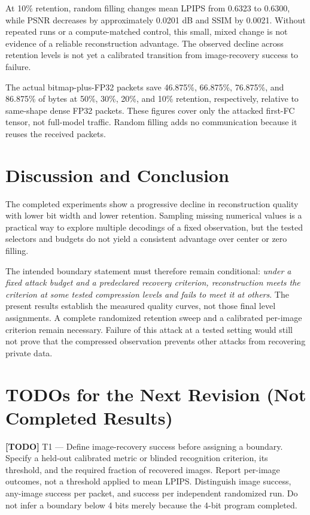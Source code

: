 \documentclass{article}
\newcommand{\todo}[1]{\par\noindent\textbf{[TODO]} #1\par}
\newif\ifshowtodos
\begin{document}
At 10\% retention, random filling changes mean LPIPS from 0.6323 to
0.6300, while PSNR decreases by approximately 0.0201 dB and SSIM by
0.0021. Without repeated runs or a compute-matched control, this small,
mixed change is not evidence of a reliable reconstruction advantage.
The observed decline across retention levels is not yet a calibrated
transition from image-recovery success to failure.

The actual bitmap-plus-FP32 packets save 46.875\%, 66.875\%, 76.875\%,
and 86.875\% of bytes at 50\%, 30\%, 20\%, and 10\% retention, respectively,
relative to same-shape dense FP32 packets. These figures cover only the
attacked first-FC tensor, not full-model traffic. Random filling adds no
communication because it reuses the received packets.

\section{Discussion and Conclusion}
The completed experiments show a progressive decline in reconstruction
quality with lower bit width and lower retention. Sampling missing
numerical values is a practical way to explore multiple decodings of a
fixed observation, but the tested selectors and budgets do not yield a
consistent advantage over center or zero filling.

The intended boundary statement must therefore remain conditional:
\emph{under a fixed attack budget and a predeclared recovery criterion,
reconstruction meets the criterion at some tested compression levels and
fails to meet it at others}. The present results establish the measured
quality curves, not those final level assignments. A complete randomized
retention sweep and a calibrated per-image criterion remain necessary.
Failure of this attack at a tested setting would still not prove that the
compressed observation prevents other attacks from recovering private data.

\ifshowtodos
\section*{TODOs for the Next Revision (Not Completed Results)}
\todo{T1 --- Define image-recovery success before assigning a boundary.
Specify a held-out calibrated metric or blinded recognition criterion,
its threshold, and the required fraction of recovered images. Report
per-image outcomes, not a threshold applied to mean LPIPS. Distinguish
image success, any-image success per packet, and success per independent
randomized run. Do not infer a boundary below 4 bits merely because the
4-bit program completed.}
\end{document}

